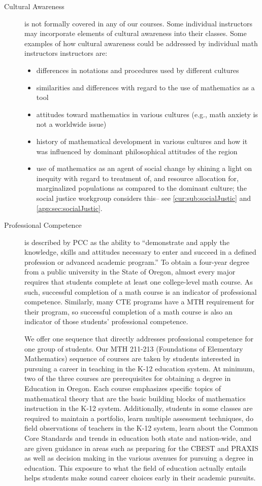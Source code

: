 \begin{description}
\item[Cultural Awareness] is not formally covered in any of our courses.  Some
  individual instructors may incorporate elements of cultural awareness into
  their classes.  Some examples of how cultural awareness could be addressed by
  individual math instructors instructors are: 
\begin{itemize}
\item differences in notations and procedures used by different cultures
\item similarities and differences with regard to the use of mathematics as a
  tool 
\item attitudes toward mathematics in various cultures (e.g., math anxiety is
  not a worldwide issue) 
\item history of mathematical  development in various cultures and how it was
  influenced by dominant philosophical attitudes of the region
\item use of mathematics as an agent of social change by shining a light on
  inequity with regard to treatment of, and resource allocation for,
  marginalized populations as compared to the dominant culture; the social
  justice workgroup considers this-- see \vref{cur:sub:socialJustic} and
  \vref{app:sec:socialJustic}. 
\end{itemize}

\item[Professional Competence] is described by PCC as the ability to
  ``demonstrate and apply the knowledge, skills and attitudes necessary to enter
  and succeed in a defined profession or advanced academic program.'' To obtain
  a four-year degree from a public university in the State of Oregon, almost
  every major requires that students complete at least one college-level math
  course.  As such, successful completion of a math course is an indicator of
  professional competence.  Similarly, many CTE programs have a MTH requirement
  for their program, so successful completion of a math course is also an
  indicator of those students' professional competence. 

We offer one sequence that directly addresses professional competence for one
group of students.  Our  MTH 211-213 (Foundations of Elementary Mathematics)
sequence of courses are taken by students interested in pursuing a career in
teaching in the K-12 education system.  At minimum, two of the three courses are
prerequisites for obtaining a degree in Education in Oregon.  Each course
emphasizes specific topics of mathematical theory that are the basic building
blocks of mathematics instruction in the K-12 system.  Additionally, students in
some classes are required to maintain a portfolio, learn multiple assessment
techniques, do field observations of teachers in the K-12 system, learn about
the Common Core Standards and trends in education both state and nation-wide,
and are given guidance in areas such as preparing for the CBEST and PRAXIS as
well as decision making in the various avenues for pursuing a degree in
education.  This exposure to what the field of education actually entails  helps
students make sound career choices early in their academic pursuits.


\end{description}
